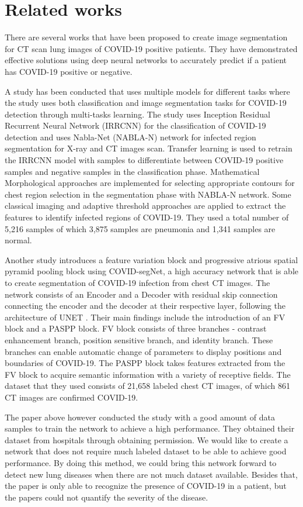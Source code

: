 \section{Related works}

There are several works that have been proposed to create image segmentation for CT scan lung images of COVID-19 positive patients. They have demonstrated effective solutions using deep neural networks to accurately predict if a patient has COVID-19 positive or negative. 

A study has been conducted that uses multiple models for different tasks where the study uses both classification and image segmentation tasks for COVID-19 detection through multi-tasks learning. The study uses Inception Residual Recurrent Neural Network (IRRCNN) for the classification of COVID-19 detection and uses Nabla-Net (NABLA-N) network for infected region segmentation for X-ray and CT images scan. \cite{ref1} Transfer learning is used to retrain the IRRCNN model with samples to differentiate between COVID-19 positive samples and negative samples in the classification phase. Mathematical Morphological approaches are implemented for selecting appropriate contours for chest region selection in the segmentation phase with NABLA-N network. Some classical imaging and adaptive threshold approaches are applied to extract the features to identify infected regions of COVID-19. They used a total number of 5,216 samples of which 3,875 samples are pneumonia and 1,341 samples are normal.

Another study \cite{ref2} introduces a feature variation block and progressive atrious spatial pyramid pooling block using COVID-segNet, a high accuracy network that is able to create segmentation of COVID-19 infection from chest CT images. The network consists of an Encoder and a Decoder with residual skip connection connecting the encoder and the decoder at their respective layer, following the architecture of UNET \cite{ref3}. Their main findings include the introduction of an FV block and a PASPP block. FV block consists of three branches - contrast enhancement branch, position sensitive branch, and identity branch. These branches can enable automatic change of parameters to display positions and boundaries of COVID-19. The PASPP block takes features extracted from the FV block to acquire semantic information with a variety of receptive fields. The dataset that they used consists of 21,658 labeled chest CT images, of which 861 CT images are confirmed COVID-19. 

The paper above however conducted the study with a good amount of data samples to train the network to achieve a high performance. They obtained their dataset from hospitals through obtaining permission. We would like to create a network that does not require much labeled dataset to be able to achieve good performance. By doing this method, we could bring this network forward to detect new lung diseases when there are not much dataset available. Besides that, the paper is only able to recognize the presence of COVID-19 in a patient, but the papers could not quantify the severity of the disease. 

